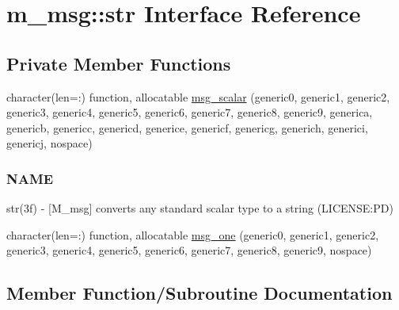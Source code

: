 \hypertarget{interfacem__msg_1_1str}{}\section{m\+\_\+msg\+:\+:str Interface Reference}
\label{interfacem__msg_1_1str}
\subsection*{Private Member Functions}
\begin{DoxyCompactItemize}
\item 
character(len=\+:) function, allocatable \mbox{\hyperlink{interfacem__msg_1_1str_a753291c72286c8c2178b9946b3318555}{msg\+\_\+scalar}} (generic0, generic1, generic2, generic3, generic4, generic5, generic6, generic7, generic8, generic9, generica, genericb, genericc, genericd, generice, genericf, genericg, generich, generici, genericj, nospace)
\begin{DoxyCompactList}\small\item\em \subsubsection*{N\+A\+ME}

str(3f) -\/ \mbox{[}M\+\_\+msg\mbox{]} converts any standard scalar type to a string (L\+I\+C\+E\+N\+SE\+:PD) \end{DoxyCompactList}\item 
character(len=\+:) function, allocatable \mbox{\hyperlink{interfacem__msg_1_1str_a2ac3f9d25332612cf356a04d48451e9a}{msg\+\_\+one}} (generic0, generic1, generic2, generic3, generic4, generic5, generic6, generic7, generic8, generic9, nospace)
\end{DoxyCompactItemize}


\subsection{Member Function/\+Subroutine Documentation}
\mbox{\label{interfacem__msg_1_1str_a2ac3f9d25332612cf356a04d48451e9a}} 
